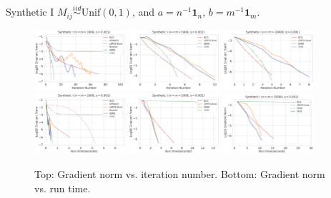 \begin{frame}{Synthetic I}
    $M_{ij}\overset{iid}{\sim}\mathrm{Unif}(0,1)$, and $a=n^{-1}\mathbf{1}_n$, $b=m^{-1}\mathbf{1}_m$.

    \begin{figure}
        \centering
        \includegraphics[width=0.3\textwidth]{save/Synthetic I/iterations/n=1000, m=1000, reg=0.001}
        \includegraphics[width=0.3\textwidth]{save/Synthetic I/iterations/n=5000, m=5000, reg=0.001}
        \includegraphics[width=0.3\textwidth]{save/Synthetic I/iterations/n=10000, m=10000, reg=0.001} \\
        \includegraphics[width=0.3\textwidth]{save/Synthetic I/run_times/n=1000, m=1000, reg=0.001}
        \includegraphics[width=0.3\textwidth]{save/Synthetic I/run_times/n=5000, m=5000, reg=0.001}
        \includegraphics[width=0.3\textwidth]{save/Synthetic I/run_times/n=10000, m=10000, reg=0.001}
        \caption{Top: Gradient norm vs. iteration number. Bottom: Gradient norm vs. run time.}
        \label{fig:synthetic_1}
    \end{figure}
\end{frame}

